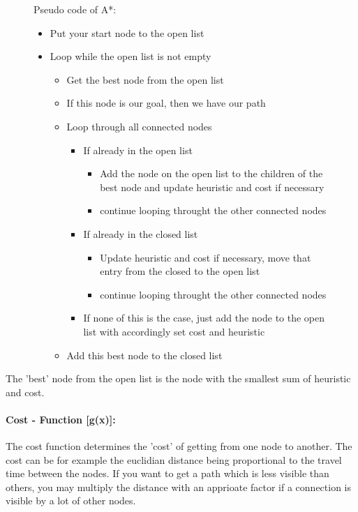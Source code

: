 \documentclass[12pt]{article}
\begin{document}
\begin {figure}[ht]
	Pseudo code of A*:
	\begin {itemize}
		\item Put your start node to the open list
		\item Loop while the open list is not empty
		\begin {itemize}
			\item Get the best node from the open list
			\item If this node is our goal, then we have our path
			
			\item Loop through all connected nodes
			\begin {itemize}
				\item If already in the open list
				\begin {itemize}
					\item Add the node on the open list to the children of the best node and update heuristic and cost if necessary
					\item continue looping throught the other connected nodes
				\end {itemize}
				\item If already in the closed list
				\begin {itemize}
					\item Update heuristic and cost if necessary, move that entry from the closed to the open list
					\item continue looping throught the other connected nodes
				\end {itemize}
				\item If none of this is the case, just add the node to the open list with accordingly set cost and heuristic
			\end {itemize}
			\item Add this best node to the closed list
		\end {itemize}
	\end {itemize}
\end {figure}

The 'best' node from the open list is the node with the smallest sum of heuristic and cost.

\paragraph{Cost - Function [g(x)]:} The cost function determines the 'cost' of getting from one node to another. The cost can be for example the euclidian distance being proportional to the travel time between the nodes. If you want to get a path which is less visible than others, you may multiply the distance with an apprioate factor if a connection is visible by a lot of other nodes.
\end{document}
